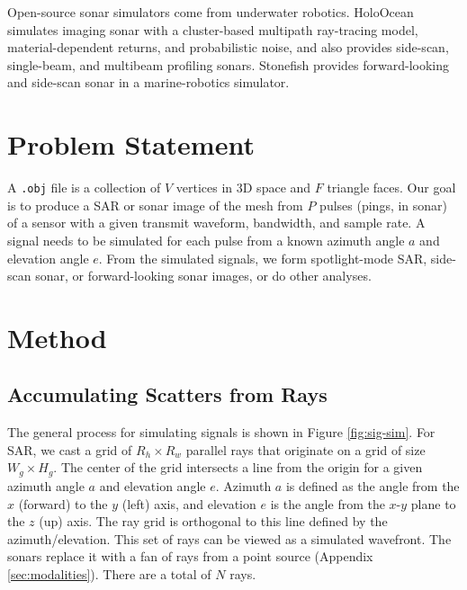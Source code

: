 \documentclass[sensors,article,submit,moreauthors]{Definitions/mdpi}
\begin{document}
Open-source sonar simulators come from underwater robotics. HoloOcean \cite{holoocean_sonar_2022} simulates imaging sonar with a cluster-based multipath ray-tracing model, material-dependent returns, and probabilistic noise, and also provides side-scan, single-beam, and multibeam profiling sonars. Stonefish \cite{stonefish_2019} provides forward-looking and side-scan sonar in a marine-robotics simulator.

\section{Problem Statement}
\label{sec:problem}
A \texttt{.obj} file is a collection of $V$ vertices in 3D space and $F$ triangle faces. Our goal is to produce a SAR or sonar image of the mesh from $P$ pulses (pings, in sonar) of a sensor with a given transmit waveform, bandwidth, and sample rate. A signal needs to be simulated for each pulse from a known azimuth angle $a$ and elevation angle $e$. From the simulated signals, we form spotlight-mode SAR, side-scan sonar, or forward-looking sonar images, or do other analyses.

\section{Method}
\label{sec:method}

\subsection{Accumulating Scatters from Rays}
\label{sec:signal-simulation}


The general process for simulating signals is shown in Figure \ref{fig:sig-sim}. For SAR, we cast a grid of $R_h \times R_w$ parallel rays that originate on a grid of size $W_g \times H_g$. The center of the grid intersects a line from the origin for a given azimuth angle $a$ and elevation angle $e$.  Azimuth $a$ is defined as the angle from the $x$ (forward) to the $y$ (left) axis, and elevation $e$ is the angle from the $x$-$y$ plane to the $z$ (up) axis. The ray grid is orthogonal to this line defined by the azimuth/elevation. This set of rays can be viewed as a simulated wavefront. The sonars replace it with a fan of rays from a point source (Appendix \ref{sec:modalities}). There are a total of $N$ rays.
\end{document}

